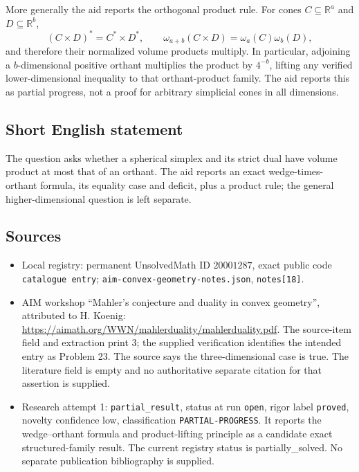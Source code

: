 \documentclass[11pt]{article}
\newcommand{\R}{\mathbb{R}}
\begin{document}
More generally the aid reports the orthogonal product rule. For cones \(C\subseteq\R^a\) and \(D\subseteq\R^b\),
\[
 (C\times D)^*=C^*\times D^*,\qquad
 \omega_{a+b}(C\times D)=\omega_a(C)\omega_b(D),
\]
and therefore their normalized volume products multiply. In particular, adjoining a \(b\)-dimensional positive orthant multiplies the product by \(4^{-b}\), lifting any verified lower-dimensional inequality to that orthant-product family. The aid reports this as partial progress, not a proof for arbitrary simplicial cones in all dimensions.
\subsection{Short English statement}
The question asks whether a spherical simplex and its strict dual have volume product at most that of an orthant. The aid reports an exact wedge-times-orthant formula, its equality case and deficit, plus a product rule; the general higher-dimensional question is left separate.
\subsection{Sources}
\begin{itemize}
\item Local registry: permanent UnsolvedMath ID \(20001287\), exact public code \texttt{catalogue entry}; \texttt{aim-convex-geometry-notes.json}, \texttt{notes[18]}.
\item AIM workshop ``Mahler's conjecture and duality in convex geometry'', attributed to H. Koenig: \url{https://aimath.org/WWN/mahlerduality/mahlerduality.pdf}. The source-item field and extraction print 3; the supplied verification identifies the intended entry as Problem 23. The source says the three-dimensional case is true. The literature field is empty and no authoritative separate citation for that assertion is supplied.
\item Research attempt 1: \texttt{partial\_result}, status at run \texttt{open}, rigor label \texttt{proved}, novelty confidence low, classification \texttt{PARTIAL-PROGRESS}. It reports the wedge--orthant formula and product-lifting principle as a candidate exact structured-family result. The current registry status is partially_solved. No separate publication bibliography is supplied.
\end{itemize}
\end{document}
